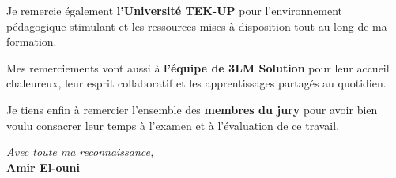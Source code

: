 \begin{tcolorbox}[
    colback=white,
    colframe=tekupBlue,
    arc=5pt,
    boxrule=1.5pt,
    left=7mm, right=7mm,
    top=6mm, bottom=6mm
]
\vspace{0.5em}

Je remercie également \textbf{l'Université TEK-UP} pour l'environnement
pédagogique stimulant et les ressources mises à disposition tout au long de ma
formation.

\vspace{0.5em}

Mes remerciements vont aussi à \textbf{l'équipe de 3LM Solution} pour leur
accueil chaleureux, leur esprit collaboratif et les apprentissages partagés au
quotidien.

\vspace{0.5em}

Je tiens enfin à remercier l'ensemble des \textbf{membres du jury} pour avoir
bien voulu consacrer leur temps à l'examen et à l'évaluation de ce travail.

\vspace{0.8em}
\begin{flushright}
    {\itshape\large Avec toute ma reconnaissance,}\\[4pt]
    {\bfseries\color{tekupBlue} Amir El-ouni}
\end{flushright}

\end{tcolorbox}

\vfill

